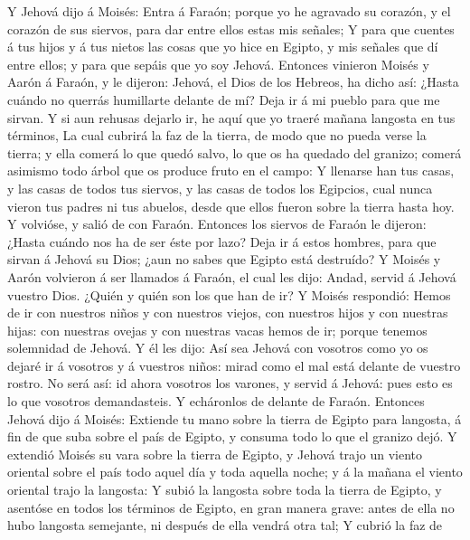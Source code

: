  Y Jehová dijo á Moisés: Entra á Faraón; porque yo he
agravado su corazón, y el corazón de sus siervos, para dar entre ellos
estas mis señales;  Y para que cuentes á tus hijos y á tus
nietos las cosas que yo hice en Egipto, y mis señales que dí entre
ellos; y para que sepáis que yo soy Jehová.  Entonces
vinieron Moisés y Aarón á Faraón, y le dijeron: Jehová, el Dios de los
Hebreos, ha dicho así: ¿Hasta cuándo no querrás humillarte delante de
mí? Deja ir á mi pueblo para que me sirvan.  Y si aun
rehusas dejarlo ir, he aquí que yo traeré mañana langosta en tus
términos,  La cual cubrirá la faz de la tierra, de modo
que no pueda verse la tierra; y ella comerá lo que quedó salvo, lo que
os ha quedado del granizo; comerá asimismo todo árbol que os produce
fruto en el campo:  Y llenarse han tus casas, y las casas
de todos tus siervos, y las casas de todos los Egipcios, cual nunca
vieron tus padres ni tus abuelos, desde que ellos fueron sobre la tierra
hasta hoy. Y volvióse, y salió de con Faraón.  Entonces
los siervos de Faraón le dijeron: ¿Hasta cuándo nos ha de ser éste por
lazo? Deja ir á estos hombres, para que sirvan á Jehová su Dios; ¿aun no
sabes que Egipto está destruído?  Y Moisés y Aarón
volvieron á ser llamados á Faraón, el cual les dijo: Andad, servid á
Jehová vuestro Dios. ¿Quién y quién son los que han de ir?
 Y Moisés respondió: Hemos de ir con nuestros niños y con
nuestros viejos, con nuestros hijos y con nuestras hijas: con nuestras
ovejas y con nuestras vacas hemos de ir; porque tenemos solemnidad de
Jehová.  Y él les dijo: Así sea Jehová con vosotros como
yo os dejaré ir á vosotros y á vuestros niños: mirad como el mal está
delante de vuestro rostro.  No será así: id ahora
vosotros los varones, y servid á Jehová: pues esto es lo que vosotros
demandasteis. Y echáronlos de delante de Faraón. 
Entonces Jehová dijo á Moisés: Extiende tu mano sobre la tierra de
Egipto para langosta, á fin de que suba sobre el país de Egipto, y
consuma todo lo que el granizo dejó.  Y extendió Moisés
su vara sobre la tierra de Egipto, y Jehová trajo un viento oriental
sobre el país todo aquel día y toda aquella noche; y á la mañana el
viento oriental trajo la langosta:  Y subió la langosta
sobre toda la tierra de Egipto, y asentóse en todos los términos de
Egipto, en gran manera grave: antes de ella no hubo langosta semejante,
ni después de ella vendrá otra tal;  Y cubrió la faz de
